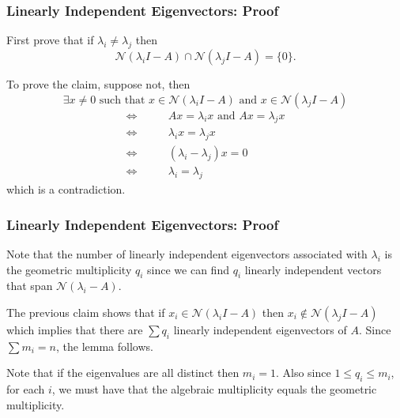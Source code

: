 \documentclass{beamer}
\begin{document}
\begin{frame}\frametitle{Linearly Independent Eigenvectors: Proof}
	\begin{proofstart}
		First prove that if $\lambda_i \neq \lambda_j$ then
		\[ 
			\mathcal{N}(\lambda_iI-A) \cap
			\mathcal{N}(\lambda_jI-A)
			= \{0\}. 
		\]
		
		To prove the claim, suppose not, then 
		\[ 
			\exists x \neq 0 \text{ such that } x \in \mathcal{N}(\lambda_iI-A) \text{ and } x \in \mathcal{N}(\lambda_jI-A) 
		\]
		\begin{align*}
		\iff &\qquad Ax = \lambda_i x \text{ and } Ax = \lambda_j x \\
		\iff &\qquad \lambda_ix = \lambda_jx \\
		\iff &\qquad (\lambda_i-\lambda_j)x = 0 \\
		\iff &\qquad \lambda_i = \lambda_j
		\end{align*}
		which is a contradiction.	
	\end{proofstart}
\end{frame}

\begin{frame}\frametitle{Linearly Independent Eigenvectors: Proof}

	\begin{proofend}
	
		Note that the number of linearly independent eigenvectors associated with $\lambda_i$ is the geometric multiplicity $q_i$ since we can find $q_i$ linearly independent vectors that span $\mathcal{N}(\lambda_i-A)$.
	
		\vspace{0.5cm}
			
		The previous claim shows that if $x_i \in \mathcal{N}(\lambda_iI-A)$ then $x_i \notin \mathcal{N}(\lambda_jI-A)$ which implies that there are $\sum q_i$ linearly independent eigenvectors of $A$.  Since $\sum m_i = n$, the lemma follows.
		
		\vspace{0.5cm}
		
		Note that if the eigenvalues are all distinct then $m_i = 1$.  Also since $1 \leq q_i \leq m_i$, for each $i$, we must have that the algebraic multiplicity equals the geometric multiplicity.
		
	\end{proofend}
	
\end{frame}
\end{document}
